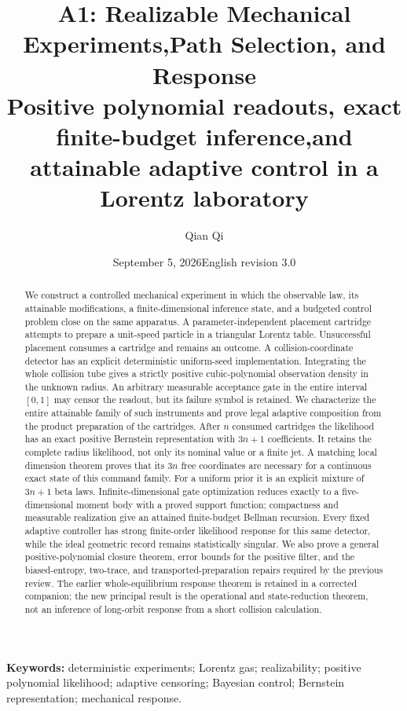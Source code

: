 \documentclass[11pt,a4paper]{article}
\title{\textbf{A1: Realizable Mechanical Experiments,\newline Path Selection, and Response}\\[.6em]
\large Positive polynomial readouts, exact finite-budget inference,\newline and attainable adaptive control in a Lorentz laboratory}
\author{Qian Qi}
\date{September 5, 2026\quad English revision 3.0}
\theoremstyle{definition}
\theoremstyle{remark}\newtheorem{remark}[theorem]{Remark}
\begin{document}
\maketitle
\begin{abstract}
We construct a controlled mechanical experiment in which the observable law,
its attainable modifications, a finite-dimensional inference state, and a
budgeted control problem close on the same apparatus. A parameter-independent
placement cartridge attempts to prepare a unit-speed particle in a triangular
Lorentz table. Unsuccessful placement consumes a cartridge and remains an
outcome. A collision-coordinate detector has an explicit deterministic
uniform-seed implementation. Integrating the whole collision tube gives a
strictly positive cubic-polynomial observation density in the unknown radius.
An arbitrary measurable acceptance gate in the entire interval $[0,1]$
may censor the readout, but its
failure symbol is retained. We characterize the entire attainable family of
such instruments and prove legal adaptive composition from the product
preparation of the cartridges. After $n$ consumed cartridges the likelihood
has an exact positive Bernstein representation with $3n+1$ coefficients.
It retains the complete radius likelihood, not only its nominal value or a
finite jet. A matching local dimension theorem proves that its $3n$ free
coordinates are necessary for a continuous exact state of this command family. For a uniform prior it is an explicit mixture of $3n+1$ beta
laws. Infinite-dimensional gate optimization reduces exactly to a
five-dimensional moment body with a proved support function; compactness and
measurable realization give an attained finite-budget Bellman recursion.
Every fixed adaptive controller has strong finite-order likelihood response
for this same detector, while the ideal geometric record remains statistically
singular. We also prove a general positive-polynomial closure theorem,
error bounds for the positive filter, and the biased-entropy, two-trace, and
transported-preparation repairs required by the previous review. The earlier
whole-equilibrium response theorem is retained in a corrected companion;
the new principal result is the operational and state-reduction theorem,
not an inference of long-orbit response from a short collision calculation.
\end{abstract}
\noindent\textbf{Keywords:} deterministic experiments; Lorentz gas; realizability;
positive polynomial likelihood; adaptive censoring; Bayesian control;
Bernstein representation; mechanical response.
\clearpage
\tableofcontents
\newpage







\appendix



\end{document}
